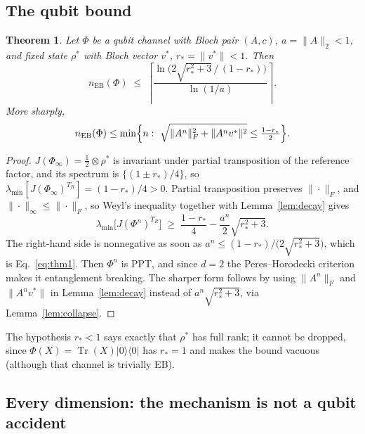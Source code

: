 \documentclass[11pt,a4paper]{article}
\newtheorem{theorem}{Theorem}[section]
\theoremstyle{definition}
\theoremstyle{remark}
\newcommand{\openone}{\mathbb{1}}%
\providecommand{\ket}[1]{|#1\rangle}
\providecommand{\bra}[1]{\langle#1|}
\begin{document}
\subsection{The qubit bound}

\begin{theorem}\label{thm:qubit}
Let $\Phi$ be a qubit channel with Bloch pair $(A,c)$, $a=\|A\|_2<1$, and
fixed state $\rho^\ast$ with Bloch vector $v^\ast$, $r_\ast=\|v^\ast\|<1$. Then
\begin{equation}\label{eq:thm1}
  n_{\mathrm{EB}}(\Phi)\;\le\;
  \left\lceil
   \frac{\ln\!\bigl(2\sqrt{r_\ast^{2}+3}\,/\,(1-r_\ast)\bigr)}{\ln(1/a)}
  \right\rceil .
\end{equation}
More sharply,
\begin{equation}\label{eq:thm1sharp}
  n_{\mathrm{EB}}(\Phi)\le\min\Bigl\{n:\
    \sqrt{\|A^{n}\|_F^{2}+\|A^{n}v^\ast\|^{2}}\le\tfrac{1-r_\ast}{2}\Bigr\}.
\end{equation}
\end{theorem}

\begin{proof}
$J(\Phi_\infty)=\tfrac{\openone}{2}\otimes\rho^\ast$ is invariant under partial
transposition of the reference factor, and its spectrum is
$\{(1\pm r_\ast)/4\}$, so $\lambda_{\min}[J(\Phi_\infty)^{T_R}]=(1-r_\ast)/4>0$. Partial
transposition preserves $\|\cdot\|_F$, and $\|\cdot\|_\infty\le\|\cdot\|_F$, so
Weyl's inequality together with Lemma~\ref{lem:decay} gives
\begin{equation}\label{eq:weylchain}
  \lambda_{\min}\bigl[J(\Phi^{n})^{T_R}\bigr]
  \;\ge\; \frac{1-r_\ast}{4}-\frac{a^{n}}{2}\sqrt{r_\ast^{2}+3}.
\end{equation}
The right-hand side is nonnegative as soon as
$a^{n}\le(1-r_\ast)\big/\bigl(2\sqrt{r_\ast^{2}+3}\bigr)$, which is
Eq.~\eqref{eq:thm1}. Then $\Phi^n$ is PPT, and since $d=2$ the
Peres--Horodecki criterion \cite{Peres96,Horodecki96} makes it entanglement
breaking. The sharper form follows by using $\|A^n\|_F$ and $\|A^nv^\ast\|$ in
Lemma~\ref{lem:decay} instead of $a^n\sqrt{r_\ast^2+3}$, via
Lemma~\ref{lem:collapse}.
\end{proof}

The hypothesis $r_\ast<1$ says exactly that $\rho^\ast$ has full rank; it cannot be
dropped, since $\Phi(X)=\operatorname{Tr}(X)\ket{0}\bra{0}$ has $r_\ast=1$ and makes
the bound vacuous (although that channel is trivially EB).

\subsection{Every dimension: the mechanism is not a qubit accident}
\end{document}
